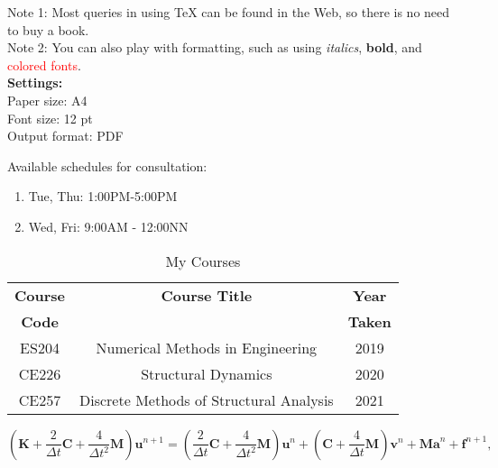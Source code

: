 \documentclass[12pt,a4paper]{article}
\begin{document}
\noindent Note 1: Most queries in using TeX can be found in the Web, so there is no need to buy a book. \\

\noindent Note 2: You can also play with formatting, such as using \textit{italics}, \textbf{bold}, and \textcolor{red}{colored fonts}. \\

\noindent \textbf{Settings:} \\
Paper size: A4 \\
Font size: 12 pt \\
Output format: PDF\\

\bigskip

\hrulefill

\newpage

\noindent Available schedules for consultation:
\begin{enumerate}
  \item Tue, Thu: 1:00PM-5:00PM
  \item Wed, Fri: 9:00AM - 12:00NN
\end{enumerate}





\begin{table} [htb]
  \begin{center}
    \caption{My Courses}
    {\begin{tabular}[t]{ccc}
        \hline
        \textbf{Course} & \textbf{Course Title}                   & \textbf{Year}  \\
        \textbf{Code}   &                                         & \textbf{Taken} \\    \hline
        ES204           & Numerical Methods in Engineering        & 2019           \\
        CE226           & Structural Dynamics                     & 2020           \\
        CE257           & Discrete Methods of Structural Analysis & 2021           \\     \hline
      \end{tabular}}
    \label{sampletablelabel}
  \end{center}
\end{table}




\begin{equation}
  (\mathbf{K}+\frac{2}{\Delta t}\mathbf{C}+\frac{4}{\Delta t^2}\mathbf{M})\mathbf{u}^{n+1}=(\frac{2}{\Delta t}\mathbf{C}+\frac{4}{\Delta t^2}\mathbf{M})\mathbf{u}^n+(\mathbf{C}+\frac{4}{\Delta t}\mathbf{M})\mathbf{v}^{n}+\mathbf{Ma}^{n}+\mathbf{f}^{n+1},
  \label{labeleq1}
\end{equation}
\end{document}
